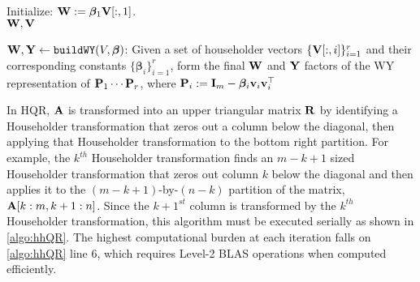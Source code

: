 \begin{algorithm2e}
	\DontPrintSemicolon %
	
	Initialize: $\mathbf{W}:=\bm{\beta}_1\mathbf{V}[:,1]$.\\%
	\Return $\mathbf{W},\mathbf{V}$
	\caption{$\mathbf{W},\mathbf{Y}\gets {\tt buildWY}(V, \bm{\beta})$: Given a set of householder vectors $\{\mathbf{V}[:,i]\}_{i=1}^r$ and their corresponding constants $\{\bm{\beta}_i\}_{i=1}^r$, form the final $\mathbf{W}$ and $\mathbf{Y}$ factors of the WY representation of $\mathbf{P}_1\cdots \mathbf{P}_r$, where $\mathbf{P}_i := \mathbf{I}_m - \bm{\beta}_i\mathbf{v}_i\mathbf{v}_i^{\top}$}
	\label{algo:buildWY}
\end{algorithm2e}

In HQR, $\mathbf{A}$ is transformed into an upper triangular matrix $\mathbf{R}$ by identifying a Householder transformation that zeros out a column below the diagonal, then applying that Householder transformation to the bottom right partition. 
For example, the $k^{th}$ Householder transformation finds an $m-k+1$ sized Householder transformation that zeros out column $k$ below the diagonal and then applies it to the $(m-k+1)$-by-$(n-k)$ partition of the matrix, $\mathbf{A}[k:m,k+1:n]$.
Since the $k+1^{st}$ column is transformed by the $k^{th}$ Householder transformation, this algorithm must be executed serially as shown in \cref{algo:hhQR}.
The highest computational burden at each iteration falls on \cref{algo:hhQR} line 6, which requires Level-2 BLAS operations when computed efficiently. \par

